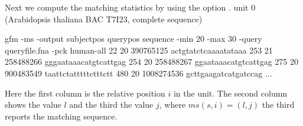 \documentclass[12pt]{article}
\newcommand{\MS}[1]{\mathit{ms(s,#1)}}
\begin{document}
Next we compute the matching statistics by using the option .
unit 0 (Arabidopsis thaliana BAC T7I23, complete sequence)

\begin{Output}
gfm -ms -output subjectpos querypos sequence -min 20 -max 30
    -query queryfile.fna -pck human-all 
22 20 390765125 actgtatctcaaaatataaa
253 21 258488266 gggaataaacatgtcattgag
254 20 258488267 ggaataaacatgtcattgag
275 20 900483549 taattctatttttctttctt
480 20 1008274536 gcttgaagatcatgatccag
...
\end{Output}

Here the first column is the relative position \(i\) in the unit. The second
column shows the value \(l\) and the third the value \(j\), where
\(\MS{i}=(l,j)\) the third reports the matching sequence.
\end{document}
